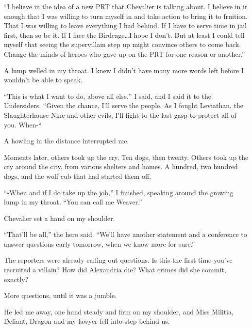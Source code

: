 ``I believe in the idea of a new PRT that Chevalier is talking about.  I believe in it enough that I was willing to turn myself in and take action to bring it to fruition.  That I was willing to leave everything I had behind.  If I have to serve time in jail first, then so be it.  If I face the Birdcage\ldots I hope I don't.  But at least I could tell myself that seeing the supervillain step up might convince others to come back.  Change the minds of heroes who gave up on the PRT for one reason or another.''



A lump welled in my throat.  I knew I didn't have many more words left before I wouldn't be able to speak.



``This is what I want to do, above all else,'' I said, and I said it to the Undersiders.  ``Given the chance, I'll serve the people.  As I fought Leviathan, the Slaughterhouse Nine and other evils, I'll fight to the last gasp to protect all of you.  When-``



A howling in the distance interrupted me.



Moments later, others took up the cry.  Ten dogs, then twenty.  Others took up the cry around the city, from various shelters and homes.  A hundred, two hundred dogs, and the wolf cub that had started them off.



``-When and if I do take up the job,'' I finished, speaking around the growing lump in my throat, ``You can call me Weaver.''



Chevalier set a hand on my shoulder.



``That'll be all,'' the hero said.  ``We'll have another statement and a conference to answer questions early tomorrow, when we know more for sure.''



The reporters were already calling out questions.  Is this the first time you've recruited a villain?  How did Alexandria die?  What crimes did she commit, exactly?



More questions, until it was a jumble.



He led me away, one hand steady and firm on my shoulder, and Miss Militia, Defiant, Dragon and my lawyer fell into step behind us.



